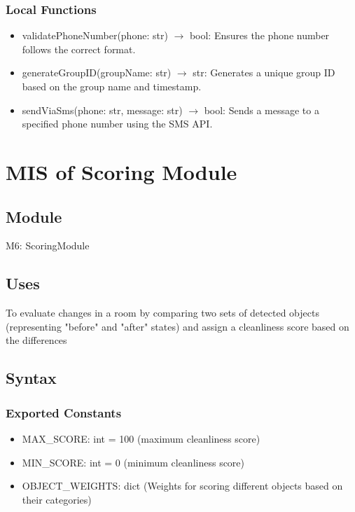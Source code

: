 \documentclass[12pt, titlepage]{article}
\begin{document}
\subsubsection{Local Functions}

\begin{itemize}
  \item validatePhoneNumber(phone: str) $\rightarrow$ bool: Ensures the phone number follows the correct format.
  \item generateGroupID(groupName: str) $\rightarrow$ str: Generates a unique group ID based on the group name and timestamp.
  \item sendViaSms(phone: str, message: str) $\rightarrow$ bool: Sends a message to a specified phone number using the SMS API.
\end{itemize}

\newpage

\section{MIS of Scoring Module} \label{Module} 

\subsection{Module}

M6: ScoringModule

\subsection{Uses}
To evaluate changes in a room by comparing two sets of detected objects (representing "before" and "after" states) and assign a cleanliness score based on the differences

\subsection{Syntax}

\subsubsection{Exported Constants}

\begin{itemize}
  \item MAX{\_}SCORE: int = 100 (maximum cleanliness score)
  \item MIN{\_}SCORE: int = 0 (minimum cleanliness score)
  \item OBJECT{\_}WEIGHTS: dict (Weights for scoring different objects based on their categories)
\end{itemize}
\end{document}
